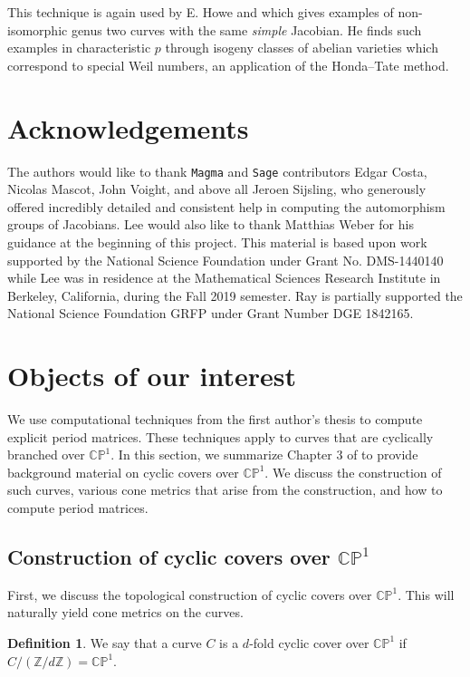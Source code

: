 \documentclass[12pt,reqno]{amsart}
\newcommand{\Z}{\mathbb{Z}}
\theoremstyle{definition}
\newtheorem{defn}{Definition}
\theoremstyle{remark}
\begin{document}
This technique is again used by E. Howe \cite{howe1} and \cite{howe2} which gives examples of non-isomorphic genus two curves with the same \textit{simple} Jacobian. He finds such examples in characteristic $p$ through isogeny classes of abelian varieties which correspond to special Weil numbers, an application of the Honda--Tate method. 

\section*{Acknowledgements} 
The authors would like to thank \texttt{Magma} and \texttt{Sage} contributors Edgar Costa, Nicolas Mascot, John Voight, and above all Jeroen Sijsling, who generously offered incredibly detailed and consistent help in computing the automorphism groups of Jacobians. Lee would also like to thank Matthias Weber for his guidance at the beginning of this project. This material is based upon work supported by the National Science Foundation under Grant No. DMS-1440140 while Lee was in residence at the Mathematical Sciences Research Institute in Berkeley, California, during the Fall 2019 semester. Ray is partially supported the National Science Foundation GRFP under Grant Number DGE 1842165.


\section{Objects of our interest}
\label{sec: dthesis}
We use computational techniques from the first author's thesis \cite{dthesis} to compute explicit period matrices. These techniques apply to curves that are cyclically branched over $\mathbb{C}\mathbb{P}^1.$ In this section, we summarize Chapter 3 of \cite{dthesis} to provide background material on cyclic covers over $\mathbb{C}\mathbb{P}^1.$ We discuss the construction of such curves, various cone metrics that arise from the construction, and how to compute period matrices. 

\subsection{Construction of cyclic covers over $\mathbb{C}\mathbb{P}^1$}
First, we discuss the topological construction of cyclic covers over $\mathbb{C}\mathbb{P}^1.$ This will naturally yield cone metrics on the curves.

\begin{defn} We say that a curve $C$ is a $d$-fold cyclic cover over $\mathbb{C}\mathbb{P}^1$ if $C / (\Z/ d \Z) = \mathbb{C}\mathbb{P}^1.$ \end{defn}
\end{document}

